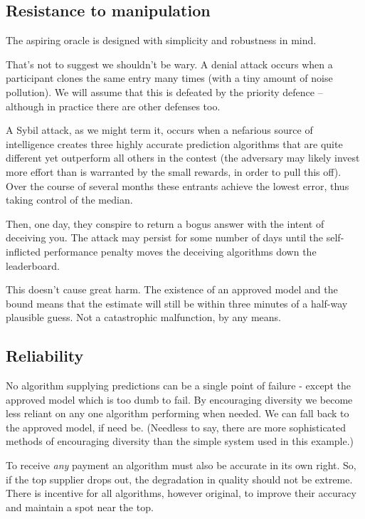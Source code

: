 \subsection{Resistance to manipulation}

The aspiring oracle is designed with simplicity and robustness in mind. 

That's not to suggest we shouldn't be wary. A denial attack occurs when a participant clones the same entry many times (with a tiny amount of noise pollution). We will assume that this is defeated by the priority defence -- although in practice there are other defenses too. 


A Sybil attack, as we might term it, occurs when a nefarious source of intelligence creates three highly accurate prediction algorithms that are quite different yet outperform all others in the contest (the adversary may likely invest more effort than is warranted by the small rewards, in order to pull this off). Over the course of several months these entrants achieve the lowest error, thus taking control of the median. 

Then, one day, they conspire to return a bogus answer with the intent of deceiving you. The attack may persist for some number of days until the self-inflicted performance penalty moves the deceiving algorithms down the leaderboard. 

This doesn't cause great harm. The existence of an approved model and the bound means that the estimate will still be within three minutes of a half-way plausible guess. Not a catastrophic malfunction, by any means.



\subsection{Reliability}

No algorithm supplying predictions can be a single point of failure - except the approved model which is too dumb to fail. By encouraging diversity we become less reliant on any one algorithm performing when needed. We can fall back to the approved model, if need be. (Needless to say, there are more sophisticated methods of encouraging diversity than the simple system used in this example.)

To receive {\em any} payment an algorithm must also be accurate in its own right. So, if the top supplier drops out, the degradation in quality should not be extreme. There is incentive for all algorithms, however original, to improve their accuracy and maintain a spot near the top. 
 
